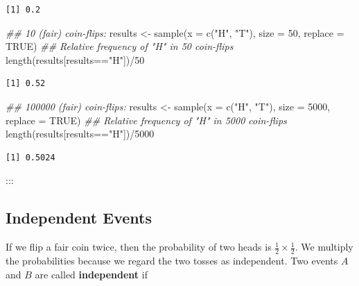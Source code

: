 \documentclass[
  letterpaper,
  DIV=11,
  numbers=noendperiod]{scrreprt}
\newenvironment{Shaded}{\begin{snugshade}}{\end{snugshade}}
\newcommand{\AttributeTok}[1]{\textcolor[rgb]{0.40,0.45,0.13}{#1}}
\newcommand{\ConstantTok}[1]{\textcolor[rgb]{0.56,0.35,0.01}{#1}}
\newcommand{\DecValTok}[1]{\textcolor[rgb]{0.68,0.00,0.00}{#1}}
\newcommand{\DocumentationTok}[1]{\textcolor[rgb]{0.37,0.37,0.37}{\textit{#1}}}
\newcommand{\FunctionTok}[1]{\textcolor[rgb]{0.28,0.35,0.67}{#1}}
\newcommand{\NormalTok}[1]{\textcolor[rgb]{0.00,0.23,0.31}{#1}}
\newcommand{\OtherTok}[1]{\textcolor[rgb]{0.00,0.23,0.31}{#1}}
\newcommand{\SpecialCharTok}[1]{\textcolor[rgb]{0.37,0.37,0.37}{#1}}
\newcommand{\StringTok}[1]{\textcolor[rgb]{0.13,0.47,0.30}{#1}}
\theoremstyle{definition}
\theoremstyle{plain}
\theoremstyle{plain}
\theoremstyle{remark}
\begin{document}
\begin{verbatim}
[1] 0.2
\end{verbatim}

\begin{Shaded}
\begin{Highlighting}[]
\DocumentationTok{\#\# 10 (fair) coin{-}flips:}
\NormalTok{results }\OtherTok{\textless{}{-}} \FunctionTok{sample}\NormalTok{(}\AttributeTok{x =} \FunctionTok{c}\NormalTok{(}\StringTok{"H"}\NormalTok{, }\StringTok{"T"}\NormalTok{), }\AttributeTok{size =} \DecValTok{50}\NormalTok{, }\AttributeTok{replace =} \ConstantTok{TRUE}\NormalTok{)}
\DocumentationTok{\#\# Relative frequency of "H" in 50 coin{-}flips}
\FunctionTok{length}\NormalTok{(results[results}\SpecialCharTok{==}\StringTok{"H"}\NormalTok{])}\SpecialCharTok{/}\DecValTok{50}
\end{Highlighting}
\end{Shaded}

\begin{verbatim}
[1] 0.52
\end{verbatim}

\begin{Shaded}
\begin{Highlighting}[]
\DocumentationTok{\#\# 100000 (fair) coin{-}flips:}
\NormalTok{results }\OtherTok{\textless{}{-}} \FunctionTok{sample}\NormalTok{(}\AttributeTok{x =} \FunctionTok{c}\NormalTok{(}\StringTok{"H"}\NormalTok{, }\StringTok{"T"}\NormalTok{), }\AttributeTok{size =} \DecValTok{5000}\NormalTok{, }\AttributeTok{replace =} \ConstantTok{TRUE}\NormalTok{)}
\DocumentationTok{\#\# Relative frequency of "H" in 5000 coin{-}flips}
\FunctionTok{length}\NormalTok{(results[results}\SpecialCharTok{==}\StringTok{"H"}\NormalTok{])}\SpecialCharTok{/}\DecValTok{5000}
\end{Highlighting}
\end{Shaded}

\begin{verbatim}
[1] 0.5024
\end{verbatim}

:::

\hypertarget{independent-events}{%
\subsection{Independent Events}\label{independent-events}}

If we flip a fair coin twice, then the probability of two heads is
\(\frac{1}{2} \times \frac{1}{2}\). We multiply the probabilities
because we regard the two tosses as independent. Two events \(A\) and
\(B\) are called \textbf{independent} if
\end{document}
